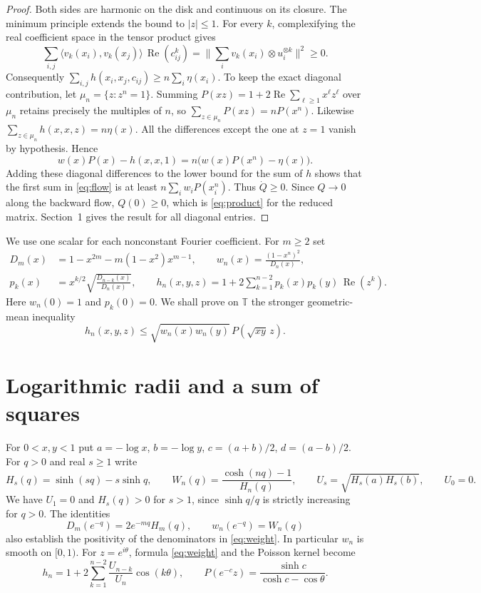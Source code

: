 \documentclass[10pt,twoside,reqno]{amsart}
\numberwithin{equation}{section}
\newcommand{\T}{\mathbb T}
\newcommand{\Real}{\operatorname{Re}}
\begin{document}
\begin{proof}
Both sides are harmonic on the disk and continuous on its closure.
The minimum principle extends the bound to \(|z|\le1\). For every \(k\),
complexifying the real coefficient space in the tensor product gives
\[
 \sum_{i,j}\langle v_k(x_i),v_k(x_j)\rangle\,\Real(c_{ij}^k)
 =\Big\|\sum_i v_k(x_i)\otimes u_i^{\otimes k}\Big\|^2\ge0.
\]
Consequently \(\sum_{i,j}h(x_i,x_j,c_{ij})\ge n\sum_i\eta(x_i)\).
To keep the exact diagonal contribution, let \(\mu_n=\{z:z^n=1\}\).
Summing \(P(xz)=1+2\Real\sum_{\ell\ge1}x^\ell z^\ell\) over \(\mu_n\)
retains precisely the multiples of \(n\), so \(\sum_{z\in\mu_n}P(xz)=nP(x^n)\).
Likewise \(\sum_{z\in\mu_n}h(x,x,z)=n\eta(x)\). All the differences except
the one at \(z=1\) vanish by hypothesis. Hence
\[
 w(x)P(x)-h(x,x,1)=n\bigl(w(x)P(x^n)-\eta(x)\bigr).
\]
Adding these diagonal differences to the lower bound for the sum of \(h\)
shows that the first sum in \eqref{eq:flow} is at least \(n\sum_i w_iP(x_i^n)\).
Thus \(\dot Q\ge0\). Since \(Q\to0\) along the backward flow,
\(Q(0)\ge0\), which is \eqref{eq:product} for the reduced matrix.
Section~1 gives the result for all diagonal entries.
\end{proof}

We use one scalar for each nonconstant Fourier coefficient. For \(m\ge2\) set
\begin{equation}\label{eq:weight}
 \begin{split}
 D_m(x)&=1-x^{2m}-m(1-x^2)x^{m-1},\qquad
 w_n(x)=\frac{(1-x^n)^2}{D_n(x)},\\
 p_k(x)&=x^{k/2}\sqrt{\frac{D_{n-k}(x)}{D_n(x)}},\qquad
 h_n(x,y,z)=1+2\sum_{k=1}^{n-2}p_k(x)p_k(y)\,\Real(z^k).
 \end{split}
\end{equation}
Here \(w_n(0)=1\) and \(p_k(0)=0\). We shall prove on \(\T\) the stronger
geometric-mean inequality
\begin{equation}\label{eq:minorant}
 h_n(x,y,z)\le\sqrt{w_n(x)w_n(y)}\,P(\sqrt{xy}\,z).
\end{equation}

\section{Logarithmic radii and a sum of squares}

For \(0<x,y<1\) put \(a=-\log x\), \(b=-\log y\), \(c=(a+b)/2\),
\(d=(a-b)/2\). For \(q>0\) and real \(s\ge1\) write
\[
 H_s(q)=\sinh(sq)-s\sinh q,\qquad
 W_n(q)=\frac{\cosh(nq)-1}{H_n(q)},\qquad
 U_s=\sqrt{H_s(a)H_s(b)},\qquad U_0=0 .
\]
We have \(U_1=0\) and \(H_s(q)>0\) for \(s>1\), since \(\sinh q/q\)
is strictly increasing for \(q>0\). The identities
\[
 D_m(e^{-q})=2e^{-mq}H_m(q),\qquad w_n(e^{-q})=W_n(q)
\]
also establish the positivity of the denominators in \eqref{eq:weight}.
In particular \(w_n\) is smooth on \([0,1)\).
For \(z=e^{i\theta}\), formula \eqref{eq:weight} and the Poisson kernel become
\[
 h_n=1+2\sum_{k=1}^{n-2}\frac{U_{n-k}}{U_n}\cos(k\theta),\qquad
 P(e^{-c}z)=\frac{\sinh c}{\cosh c-\cos\theta}.
\]
\end{document}
